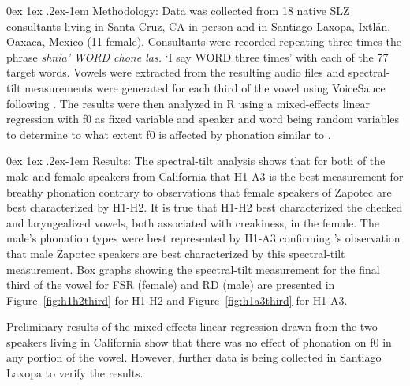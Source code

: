 \documentclass[11pt, letterpaper]{article}
\makeatletter
\renewcommand{\paragraph}{%
  \@startsection{paragraph}{4}%
  {\z@}{0ex \@plus 1ex \@minus .2ex}{-1em}%
  {\normalfont\normalsize\bfseries}%
}
\makeatother
\begin{document}
\paragraph{Methodology:} 
Data was collected from 18 native SLZ consultants living in Santa Cruz, CA in person and in Santiago Laxopa, Ixtlán, Oaxaca, Mexico (11 female).  
Consultants were recorded repeating three times the phrase \textit{shnia' WORD chone las.} `I say WORD three times' with each of the 77 target words.
Vowels were extracted from the resulting audio files and spectral-tilt measurements were generated for each third of the vowel using VoiceSauce \citep{shueVOICESAUCEProgramVoice2009} following \citet{garellekAcousticConsequencesPhonation2011}. The results were then analyzed in R \citep{rcoreteamLanguageEnvironmentStatistical2021} using a mixed-effects linear regression with f0 as fixed variable and speaker and word being random variables to determine to what extent f0 is affected by phonation similar to \citet{dicanioCoarticulationToneGlottal2012}.  

\paragraph{Results:}
The spectral-tilt analysis shows that for both of the male and female speakers from California that H1-A3 is the best measurement for breathy phonation contrary to  observations that female speakers of Zapotec are best characterized by H1-H2. It is true that H1-H2 best characterized the checked and laryngealized vowels, both associated with creakiness, in the female. The male's phonation types were best represented by H1-A3 confirming 's observation that male Zapotec speakers are best characterized by this spectral-tilt measurement. Box graphs showing the spectral-tilt measurement for the final third of the vowel for FSR (female) and RD (male) are presented in Figure~\ref{fig:h1h2third} for H1-H2 and Figure~\ref{fig:h1a3third} for H1-A3.

Preliminary results of the mixed-effects linear regression drawn from the two speakers living in California show that there was no effect of phonation on f0 in any portion of the vowel. However, further data is being collected in Santiago Laxopa to verify the results.
\end{document}
